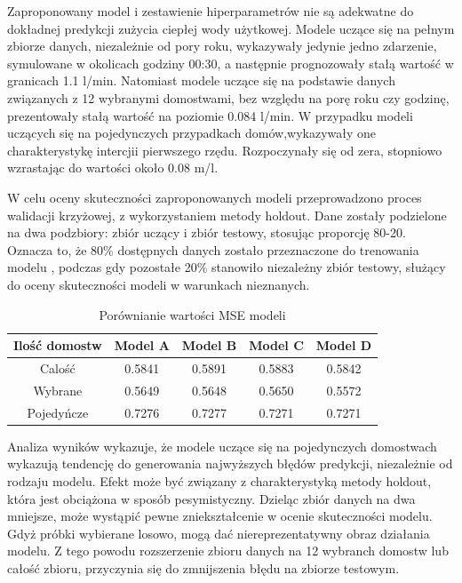 \documentclass[a4paper,twoside,12pt]{book}
\begin{document}
Zaproponowany model i zestawienie hiperparametrów nie są adekwatne do dokładnej predykcji zużycia ciepłej wody użytkowej. Modele uczące się na pełnym zbiorze danych, niezależnie od pory roku, wykazywały jedynie jedno zdarzenie, symulowane w okolicach godziny 00:30, a następnie prognozowały stałą wartość w granicach 1.1 l/min. Natomiast modele uczące się na podstawie danych związanych z 12 wybranymi domostwami, bez względu na porę roku czy godzinę, prezentowały stałą wartość na poziomie 0.084 l/min. W przypadku modeli uczących się na pojedynczych przypadkach domów,wykazywały one charakterystykę intercjii pierwszego rzędu. Rozpoczynały się od zera, stopniowo wzrastając do wartości około 0.08 m/l.

\newpage
W celu oceny skuteczności zaproponowanych modeli przeprowadzono proces walidacji krzyżowej, z wykorzystaniem metody holdout. Dane zostały podzielone na dwa podzbiory: zbiór uczący i zbiór testowy, stosując proporcję 80-20. Oznacza to, że 80\% dostępnych danych zostało przeznaczone do trenowania modelu , podczas gdy pozostałe 20\% stanowiło niezależny zbiór testowy, służący do oceny skuteczności modeli w warunkach nieznanych.
\begin{table}[!h]
  \centering
  \renewcommand{\arraystretch}{1.5}
  \caption{Porównianie wartości MSE modeli}
  \begin{tabular}{|c|c|c|c|c|}
    \hline
    Ilość domostw & Model A & Model B & Model C & Model D \\ \hline
    Calość        & 0.5841  & 0.5891  & 0.5883  & 0.5842  \\ \hline
    Wybrane       & 0.5649  & 0.5648  & 0.5650  & 0.5572  \\ \hline
    Pojedyńcze    & 0.7276  & 0.7277  & 0.7271  & 0.7271  \\ \hline
  \end{tabular}
\end{table}

Analiza wyników wykazuje, że modele uczące się na pojedynczych domostwach wykazują tendencję do generowania najwyższych błędów predykcji, niezależnie od rodzaju modelu. Efekt może być związany z charakterystyką metody holdout, która jest obciążona w sposób pesymistyczny. Dzieląc zbiór danych na dwa mniejsze,  może wystąpić pewne zniekształcenie w ocenie skuteczności modelu. Gdyż próbki wybierane losowo, mogą dać niereprezentatywny obraz działania modelu. Z tego powodu rozszerzenie zbioru danych na 12 wybranch domostw lub całość zbioru, przyczynia się do zmnijszenia błędu na zbiorze testowym.
\end{document}
